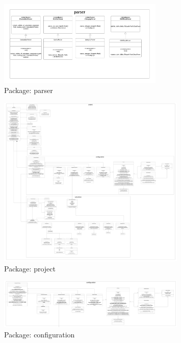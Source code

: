 \documentclass[letterpaper,10pt,english]{sphinxmanual}
\begin{document}
\hypertarget{parser}{
\begin{figure}[hbt!]
  \centering
\includegraphics[width=0.7\textwidth]
        {pictures/parser.png}
  \caption{Package: parser}
  \label{fig:mvc}
\end{figure}
}

\hypertarget{project}{
\begin{figure}[hbt!]
  \centering
\includegraphics[width=0.8\textwidth]
        {pictures/project.png}
  \caption{Package: project}
  \label{fig:mvc}
\end{figure}
}

\hypertarget{configuration}{
\begin{figure}[hbt!]
  \centering
\includegraphics[width=0.8\textwidth]
        {pictures/configuration.png}
  \caption{Package: configuration}
  \label{fig:mvc}
\end{figure}
}
\end{document}
